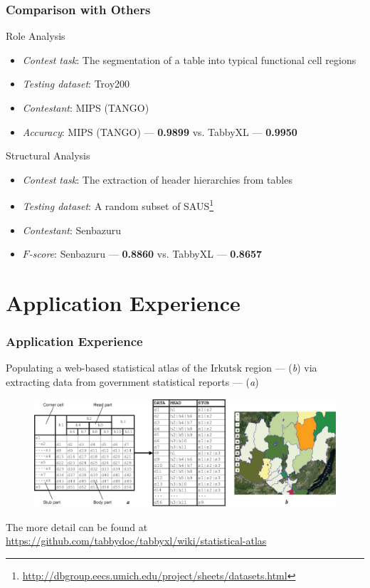 \documentclass{beamer}
\begin{document}
\begin{frame}
\frametitle{Comparison with Others}

\small{
\begin{block}{Role Analysis}
\begin{itemize}
\item \emph{Contest task}: The segmentation of a table into typical functional cell regions
\item \emph{Testing dataset}: Troy200  \cite{Nagy2016}
\item \emph{Contestant}: MIPS (TANGO) \cite{Embley2016}
\item \emph{Accuracy}: MIPS (TANGO) --- \textbf{0.9899} vs. TabbyXL --- \textbf{0.9950}
\end{itemize}
\end{block}

\begin{block}{Structural Analysis}
\begin{itemize}
	\item \emph{Contest task}: The extraction of header hierarchies from tables
	\item \emph{Testing dataset}: A random subset of SAUS\footnote{\url{http://dbgroup.eecs.umich.edu/project/sheets/datasets.html}}
	\item \emph{Contestant}: Senbazuru \cite{Chen2014}
	\item $F$\emph{-score}: Senbazuru --- \textbf{0.8860} vs. TabbyXL --- \textbf{0.8657}
\end{itemize}
\end{block}
}
\end{frame}

\section{Application Experience}

\begin{frame}
\frametitle{Application Experience}
Populating a web-based statistical atlas of the Irkutsk region --- (\textit{b}) via extracting data from government statistical reports --- (\textit{a})
\begin{figure}
\includegraphics[width=1\linewidth]{application1}
\end{figure}
\tiny{The more detail can be found at \url{https://github.com/tabbydoc/tabbyxl/wiki/statistical-atlas}}
\end{frame}
\end{document}
